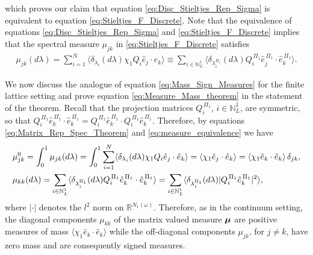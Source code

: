 \documentclass{cmslatex}
\newcommand\bmu{\mbox{\boldmath${\mu}$}}
\begin{document}
%
which proves our claim that equation \eqref{eq:Disc_Stieltjes_Rep_Sigma} is
equivalent to equation \eqref{eq:Stieltjes_F_Discrete}. Note
that the equivalence of equations \eqref{eq:Disc_Stieltjes_Rep_Sigma}
and \eqref{eq:Stieltjes_F_Discrete} implies that the spectral 
measure $\mu_{jk}$ in \eqref{eq:Stieltjes_F_Discrete} satisfies 
%
\begin{align}\label{eq:measure_equivalence} 
  \mu_{jk}(d\lambda)=\sum_{i=1}^N \langle\delta_{\lambda_i}(d\lambda)\chi_1Q_i\hat{e}_j\cdot\hat{e}_k\rangle
         \equiv\sum_{i\in\mathbb{N}_L^1}
          \langle\delta_{\lambda_i^{\Pi_1}}(d\lambda)Q_i^{\,\Pi_1}\hat{e}_j^{\,\Pi_1}\cdot\hat{e}_k^{\,\Pi_1}\rangle.
\end{align}
%

We now discuss the analogue of equation \eqref{eq:Mass_Sign_Measures}
for the finite lattice setting and prove equation
\eqref{eq:Measure_Mass_theorem} in the statement of the
theorem. Recall that the projection matrices $Q_i^{\,\Pi_1}$,
$i\in\mathbb{N}_L^1$, are symmetric, so that
$Q_i^{\,\Pi_1}\hat{e}_k^{\,\Pi_1}\cdot\hat{e}_k^{\,\Pi_1}
=Q_i^{\,\Pi_1}\hat{e}_k^{\,\Pi_1}\cdot Q_i^{\,\Pi_1}\hat{e}_k^{\,\Pi_1}$. Therefore,
by equations \eqref{eq:Matrix_Rep_Spec_Theorem} and
\eqref{eq:measure_equivalence} we have   
%
\begin{align}\label{eq:Measure_Mass_Lattice}
  &\mu^0_{jk}=\int_0^1\mu_{jk}(d\lambda)
       =\int_0^1\sum_{i=1}^N \langle\delta_{\lambda_i}(d\lambda)\chi_1Q_i\hat{e}_j\cdot\hat{e}_k\rangle
       =\langle\chi_1\hat{e}_j\cdot\hat{e}_k\rangle
       =\langle\chi_1\hat{e}_k\cdot\hat{e}_k\rangle\,\delta_{jk}, \notag\\
 &\mu_{kk}(d\lambda)=\sum_{i\in\mathbb{N}_L^1}
             \langle\delta_{\lambda_i^{\Pi_1}}(d\lambda)Q_i^{\,\Pi_1}\hat{e}_k^{\,\Pi_1}\cdot\hat{e}_k^{\,\Pi_1}\rangle
         =\sum_{i\in\mathbb{N}_L^1}
             \langle\delta_{\lambda_i^{\Pi_1}}(d\lambda)|Q_i^{\,\Pi_1}\hat{e}_k^{\,\Pi_1}|^2\rangle,            
\end{align}
%
where $|\cdot|$ denotes the $l^2$ norm on $\mathbb{R}^{N_1(\omega)}$.
Therefore, as in the continuum setting, the diagonal components
$\mu_{kk}$ of the matrix valued measure $\bmu$ are positive measures of
mass $\langle\chi_1\hat{e}_k\cdot\hat{e}_k\rangle$ while the off-diagonal components
$\mu_{jk}$, for $j\neq k$, have zero mass and are consequently signed
measures.
\end{document}
